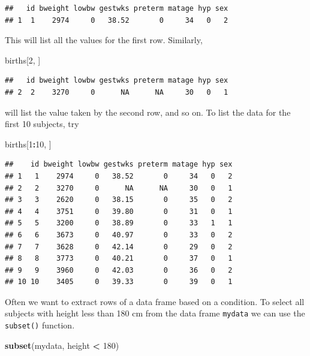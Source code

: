 \documentclass[
]{book}
\newenvironment{Shaded}{\begin{snugshade}}{\end{snugshade}}
\newcommand{\DecValTok}[1]{\textcolor[rgb]{0.00,0.00,0.81}{#1}}
\newcommand{\FunctionTok}[1]{\textcolor[rgb]{0.13,0.29,0.53}{\textbf{#1}}}
\newcommand{\NormalTok}[1]{#1}
\newcommand{\SpecialCharTok}[1]{\textcolor[rgb]{0.81,0.36,0.00}{\textbf{#1}}}
\begin{document}
\begin{verbatim}
##   id bweight lowbw gestwks preterm matage hyp sex
## 1  1    2974     0   38.52       0     34   0   2
\end{verbatim}

This will list all the values for the first row. Similarly,

\begin{Shaded}
\begin{Highlighting}[]
\NormalTok{births[}\DecValTok{2}\NormalTok{, ]}
\end{Highlighting}
\end{Shaded}

\begin{verbatim}
##   id bweight lowbw gestwks preterm matage hyp sex
## 2  2    3270     0      NA      NA     30   0   1
\end{verbatim}

will list the value taken by the second row, and so on.
To list the data for the first 10 subjects, try

\begin{Shaded}
\begin{Highlighting}[]
\NormalTok{births[}\DecValTok{1}\SpecialCharTok{:}\DecValTok{10}\NormalTok{, ]}
\end{Highlighting}
\end{Shaded}

\begin{verbatim}
##    id bweight lowbw gestwks preterm matage hyp sex
## 1   1    2974     0   38.52       0     34   0   2
## 2   2    3270     0      NA      NA     30   0   1
## 3   3    2620     0   38.15       0     35   0   2
## 4   4    3751     0   39.80       0     31   0   1
## 5   5    3200     0   38.89       0     33   1   1
## 6   6    3673     0   40.97       0     33   0   2
## 7   7    3628     0   42.14       0     29   0   2
## 8   8    3773     0   40.21       0     37   0   1
## 9   9    3960     0   42.03       0     36   0   2
## 10 10    3405     0   39.33       0     39   0   1
\end{verbatim}

Often we want to extract rows of a data frame based on a condition.
To select all subjects with height less than 180 cm from the
data frame \texttt{mydata} we can use the \texttt{subset()} function.

\begin{Shaded}
\begin{Highlighting}[]
\FunctionTok{subset}\NormalTok{(mydata, height }\SpecialCharTok{\textless{}} \DecValTok{180}\NormalTok{)}
\end{Highlighting}
\end{Shaded}
\end{document}
